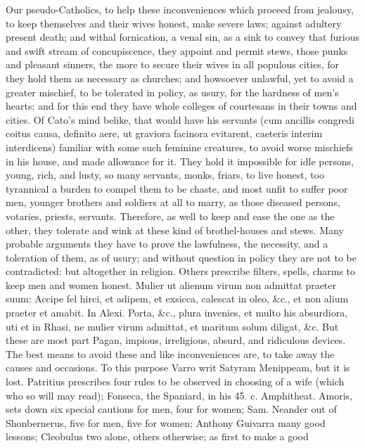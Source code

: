 {Our pseudo-Catholics, to help these inconveniences which proceed from
jealousy, to keep themselves and their wives honest, make severe laws;
against adultery present death; and withal fornication, a venal sin, as
a sink to convey that furious and swift stream of concupiscence, they
appoint and permit stews, those punks and pleasant sinners, the more to
secure their wives in all populous cities, for they hold them as
necessary as churches; and howsoever unlawful, yet to avoid a greater
mischief, to be tolerated in policy, as usury, for the hardness of
men's hearts; and for this end they have whole colleges of courtesans
in their towns and cities. Of Cato's mind belike, that would have
his servants (cum ancillis congredi coitus causa, definito aere, ut
graviora facinora evitarent, caeteris interim interdicens) familiar
with some such feminine creatures, to avoid worse mischiefs in his
house, and made allowance for it. They hold it impossible for idle
persons, young, rich, and lusty, so many servants, monks, friars, to
live honest, too tyrannical a burden to compel them to be chaste, and
most unfit to suffer poor men, younger brothers and soldiers at all to
marry, as those diseased persons, votaries, priests, servants.
Therefore, as well to keep and ease the one as the other, they tolerate
and wink at these kind of brothel-houses and stews. Many probable
arguments they have to prove the lawfulness, the necessity, and a
toleration of them, as of usury; and without question in policy they
are not to be contradicted: but altogether in religion. Others
prescribe filters, spells, charms to keep men and women honest.
Mulier ut alienum virum non admittat praeter suum: Accipe fel
hirci, et adipem, et exsicca, calescat in oleo, \&c., et non alium
praeter et amabit. In Alexi. Porta, \&c., plura invenies, et multo his
absurdiora, uti et in Rhasi, ne mulier virum admittat, et maritum solum
diligat, \&c. But these are most part Pagan, impious, irreligious,
absurd, and ridiculous devices.
The best means to avoid these and like inconveniences are, to take away
the causes and occasions. To this purpose Varro writ Satyram
Menippeam, but it is lost. Patritius prescribes four rules to be
observed in choosing of a wife (which who so will may read); Fonseca,
the Spaniard, in his 45. c. Amphitheat. Amoris, sets down six special
cautions for men, four for women; Sam. Neander out of Shonbernerus,
five for men, five for women; Anthony Guivarra many good lessons;
Cleobulus two alone, others otherwise; as first to make a good
}

